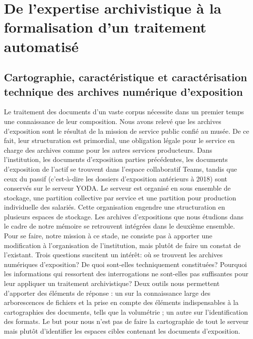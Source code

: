 \part{De l’expertise archivistique à la formalisation d’un traitement automatisé}

\chapter{Cartographie, caractéristique et caractérisation technique des archives numérique d’exposition}

Le traitement des documents d'un vaste corpus nécessite dans un premier temps une connaissance de leur composition. Nous avons relevé que les archives d'exposition sont le résultat de la mission de service public confié au musée. De ce fait, leur structuration est primordial, une obligation légale pour le service en charge des archives comme pour les autres services producteurs. Dans l'institution, les documents d'exposition parties précédentes, les documents d'exposition de l'actif se trouvent dans l'espace collaboratif Teams, tandis que ceux du passif (c'est-à-dire les dossiers d'exposition antérieurs à 2018) sont conservés sur le serveur YODA. Le serveur est organisé en sous ensemble de stockage, une partition collective par service et une partition pour production individuelle des salariés. Cette organisation engendre une structuration en plusieurs espaces de stockage. Les archives d'expositions que nous étudions dans le cadre de notre mémoire se retrouvent intégrées dans le deuxième ensemble.\\[0.1cm]

Pour se faire, notre mission à ce stade, ne consiste pas à apporter une modification à l’organisation de l'institution, mais plutôt de faire un constat de l'existant. Trois questions suscitent un intérêt: où se trouvent les archives numériques d'exposition? De quoi sont-elles techniquement constituées? Pourquoi les informations qui ressortent des interrogations ne sont-elles pas suffisantes pour leur appliquer un traitement archivistique? Deux outils nous permettent d'apporter des éléments de réponse : un sur la connaissance large des arborescences de fichiers et la prise en compte des éléments indispensables à la cartographies des documents, tells que la volumétrie ; un autre sur l'identification des formats. Le but pour nous n'est pas de faire la cartographie de tout le serveur mais plutôt d'identifier les espaces cibles contenant les documents d'exposition. 


